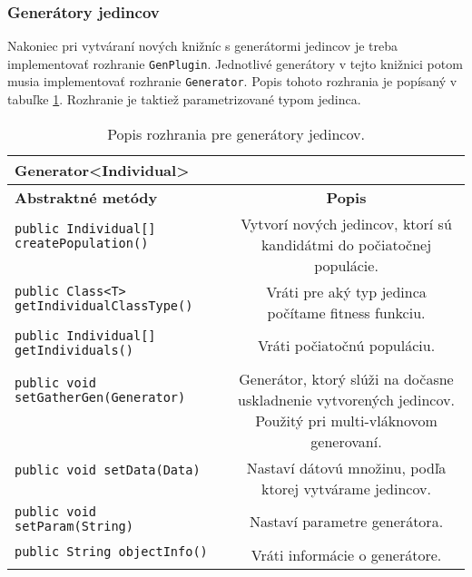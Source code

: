 \subsubsection*{Generátory jedincov}
Nakoniec pri vytváraní nových knižníc s generátormi jedincov je treba implementovať rozhranie \verb|GenPlugin|. Jednotlivé generátory v tejto knižnici potom musia implementovať rozhranie \verb|Generator|. Popis tohoto rozhrania je popísaný v tabuľke \ref{fig:tabgen}. Rozhranie je taktiež parametrizované typom jedinca.

\begin{table}
\centering
\begin{tabular}{|l|c|}
\hline
\textbf{Generator<Individual>} & \\
\hline\hline
\textbf{Abstraktné metódy} & \textbf{Popis} \\
\hline
\verb|public Individual[] createPopulation()| & \multirow{3}{5cm}{Vytvorí nových jedincov, ktorí sú kandidátmi do počiatočnej populácie.} \\
& \\
& \\
\hline
\verb|public Class<T> getIndividualClassType()| & \multirow{2}{5cm}{Vráti pre aký typ jedinca počítame fitness funkciu.} \\
& \\
\hline
\verb|public Individual[] getIndividuals()| & \multirow{2}{5cm}{Vráti počiatočnú populáciu.} \\
& \\ 
\hline
\verb|public void setGatherGen(Generator)| & \multirow{6}{5cm}{Generátor, ktorý slúži na dočasne uskladnenie vytvorených jedincov. Použitý pri multi-vláknovom generovaní.} \\
& \\ 
& \\ 
& \\ 
& \\ 
& \\
\hline
\verb|public void setData(Data)| & \multirow{3}{5cm}{Nastaví dátovú množinu, podľa ktorej vytvárame jedincov.} \\
& \\
& \\
\hline
\verb|public void setParam(String)| & \multirow{2}{5cm}{Nastaví parametre generátora.} \\
& \\
\hline
\verb|public String objectInfo()| & \multirow{2}{5cm}{Vráti informácie o generátore.} \\
& \\ 
\hline
\end{tabular}
\caption{Popis rozhrania pre generátory jedincov.}\label{fig:tabgen}
\end{table}

